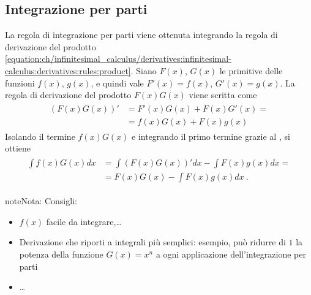 \documentclass[letterpaper,10pt,italian]{jupyterBook}
\begin{document}
\subsection{Integrazione per parti}
\label{\detokenize{ch/infinitesimal_calculus/integrals:integrazione-per-parti}}\label{\detokenize{ch/infinitesimal_calculus/integrals:infinitesimal-calculus-integrals-by-parts}}
\sphinxAtStartPar
La regola di integrazione per parti viene ottenuta integrando la regola di derivazione del prodotto \eqref{equation:ch/infinitesimal_calculus/derivatives:infinitesimal-calculus:derivatives:rules:product}. Siano \(F(x)\), \(G(x)\) le primitive delle funzioni \(f(x)\), \(g(x)\), e quindi vale \(F'(x) = f(x)\), \(G'(x) = g(x)\).
La regola di derivazione del prodotto \(F(x)G(x)\) viene scritta come
\begin{equation*}
\begin{split}\begin{aligned}
  (F(x) G(x))' & = F'(x) G(x) + F(x) G'(x) = \\
  & = f(x) G(x) + F(x) g(x)
\end{aligned}\end{split}
\end{equation*}
\sphinxAtStartPar
Isolando il termine \(f(x)G(x)\) e integrando il primo termine grazie al {\hyperref[\detokenize{ch/infinitesimal_calculus/integrals:infinitesimal-calculus-integrals-thm-fund}]{}}, si ottiene
\begin{equation*}
\begin{split}\begin{aligned}
\int f(x) G(x) dx & = \int \left( F(x) G(x) \right)' dx - \int F(x) g(x) dx = \\
& = F(x) G(x) - \int F(x) g(x) dx  \ .
\end{aligned}\end{split}
\end{equation*}
\begin{sphinxadmonition}{note}{Nota:}
\sphinxAtStartPar
Consigli:
\begin{itemize}
\item {} 
\sphinxAtStartPar
\(f(x)\) facile da integrare,…

\item {} 
\sphinxAtStartPar
Derivazione che riporti a integrali più semplici: esempio, può ridurre di \(1\) la potenza della funzione \(G(x) = x^n\) a ogni applicazione dell’integrazione per parti

\item {} 
\sphinxAtStartPar
…

\end{itemize}
\end{sphinxadmonition}
\end{document}

